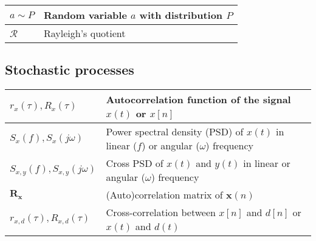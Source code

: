 \documentclass{article}
\begin{document}
\begin{xltabular}{\textwidth}{XX}
	\(a\sim P\)                                                                                                                                  & Random variable \(a\) with distribution \(P\)                                                                                                                           \\ \hline
	\(\mathcal{R}\)                                                                                                                              & Rayleigh's quotient
\end{xltabular}
\subsection{Stochastic processes}
\begin{xltabular}{\textwidth}{XX}
	\(r_x(\tau), R_x(\tau)\)                                                                                                      & Autocorrelation function of the signal \(x(t)\) or \(x[n]\) \cite{nossekAdaptiveArraySignal2015}                                                                                                                                   \\ \hline
	\(S_x(f), S_x(j\omega)\)                                                                                                      & Power spectral density (PSD) of \(x(t)\) in linear (\(f\)) or angular (\(\omega\)) frequency                                                                                                                                       \\ \hline
	\(S_{x,y}(f), S_{x,y}(j\omega)\)                                                                                              & Cross PSD of \(x(t)\) and \(y(t)\) in linear or angular (\(\omega\)) frequency                                                                                                                                                     \\ \hline
	\(\mathbf{R}_\mathbf{x}\)                                                                                                     & (Auto)correlation matrix of \(\mathbf{x}(n)\)                                                                                                                                                                                      \\ \hline
	\(r_{x,d}(\tau), R_{x,d}(\tau)\)                                                                                              & Cross-correlation between \(x[n]\) and \(d[n]\) or \(x(t)\) and \(d(t)\) \cite{nossekAdaptiveArraySignal2015}                                                                                                                      \\ \hline

\end{xltabular}
\end{document}
